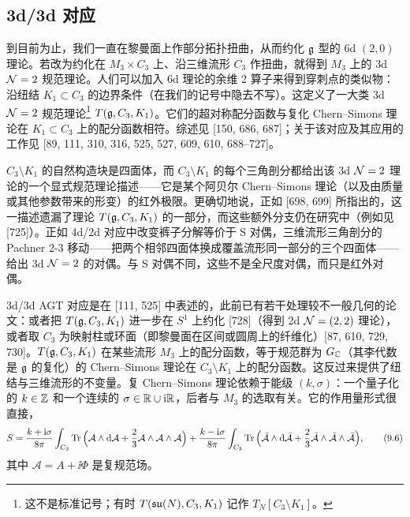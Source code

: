 \subsection{3d/3d 对应}

到目前为止，我们一直在黎曼面上作部分拓扑扭曲，从而约化 $\mathfrak{g}$ 型的 6d $(2,0)$ 理论。若改为约化在 $M_3\times C_3$ 上、沿三维流形 $C_3$ 作扭曲，就得到 $M_3$ 上的 3d $\mathcal{N}=2$ 规范理论。人们可以加入 6d 理论的余维 2 算子来得到穿刺点的类似物：沿纽结 $K_1\subset C_3$ 的边界条件（在我们的记号中隐去不写）。这定义了一大类 3d $\mathcal{N}=2$ 规范理论\footnote{这不是标准记号；有时 $T(\mathfrak{su}(N),C_3,K_1)$ 记作 $T_N[C_3\setminus K_1]$。} $T(\mathfrak{g},C_3,K_1)$。它们的超对称配分函数与复化 Chern--Simons 理论在 $K_1\subset C_3$ 上的配分函数相符。综述见 [150, 686, 687]；关于该对应及其应用的工作见 [89, 111, 310, 316, 525, 527, 609, 610, 688--727]。

$C_3\setminus K_1$ 的自然构造块是四面体，而 $C_3\setminus K_1$ 的每个三角剖分都给出该 3d $\mathcal{N}=2$ 理论的一个显式规范理论描述------它是某个阿贝尔 Chern--Simons 理论（以及由质量或其他参数带来的形变）的红外极限。更确切地说，正如 [698, 699] 所指出的，这一描述遗漏了理论 $T(\mathfrak{g},C_3,K_1)$ 的一部分，而这些额外分支仍在研究中（例如见 [725]）。正如 4d/2d 对应中改变裤子分解等价于 S 对偶，三维流形三角剖分的 Pachner 2-3 移动------把两个相邻四面体换成覆盖流形同一部分的三个四面体------给出 3d $\mathcal{N}=2$ 的对偶。与 S 对偶不同，这些不是全尺度对偶，而只是红外对偶。

3d/3d AGT 对应是在 [111, 525] 中表述的，此前已有若干处理较不一般几何的论文：或者把 $T(\mathfrak{g},C_3,K_1)$ 进一步在 $S^1$ 上约化 [728]（得到 2d $\mathcal{N}=(2,2)$ 理论），或者取 $C_3$ 为映射柱或环面（即黎曼面在区间或圆周上的纤维化）[87, 610, 729, 730]。$T(\mathfrak{g},C_3,K_1)$ 在某些流形 $M_3$ 上的配分函数，等于规范群为 $G_{\mathbb{C}}$（其李代数是 $\mathfrak{g}$ 的复化）的 Chern--Simons 理论在 $C_3\setminus K_1$ 上的配分函数。这反过来提供了纽结与三维流形的不变量。复 Chern--Simons 理论依赖于能级 $(k,\sigma)$：一个量子化的 $k\in\mathbb{Z}$ 和一个连续的 $\sigma\in\mathbb{R}\cup\mathrm{i}\mathbb{R}$，后者与 $M_3$ 的选取有关。它的作用量形式很直接，
\begin{equation}
S=\frac{k+\mathrm{i}\sigma}{8\pi}\int_{C_3}\operatorname{Tr}\Big(\mathcal{A}\wedge \mathrm{d}\mathcal{A}+\frac{2}{3}\mathcal{A}\wedge\mathcal{A}\wedge\mathcal{A}\Big)
+\frac{k-\mathrm{i}\sigma}{8\pi}\int_{C_3}\operatorname{Tr}\Big(\bar{\mathcal{A}}\wedge \mathrm{d}\bar{\mathcal{A}}+\frac{2}{3}\bar{\mathcal{A}}\wedge\bar{\mathcal{A}}\wedge\bar{\mathcal{A}}\Big),
\tag{9.6}
\end{equation}
其中 $\mathcal A=A+\ii\Phi$ 是复规范场。

